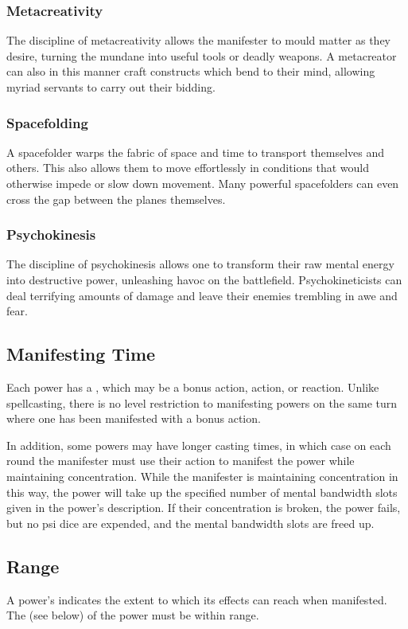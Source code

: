 \subsubsection{Metacreativity}
The discipline of metacreativity allows the manifester to mould
matter as they desire,
turning the mundane into useful tools or deadly weapons.
A metacreator can also in this manner craft constructs
which bend to their mind,
allowing myriad servants to carry out their bidding.

\subsubsection{Spacefolding}
A spacefolder warps the fabric of space and time to
transport themselves and others.
This also allows them to move effortlessly in conditions
that would otherwise impede or slow down movement. 
Many powerful spacefolders can even cross the gap between
the planes themselves.

\subsubsection{Psychokinesis}
The discipline of psychokinesis allows one to transform
their raw mental energy into destructive power,
unleashing havoc on the battlefield.
Psychokineticists can deal terrifying amounts of damage
and leave their enemies trembling in awe and fear.

\subsection{Manifesting Time}
Each power has a ,
which may be a bonus action, action, or reaction.
Unlike spellcasting,
there is no level restriction to manifesting powers
on the same turn where one has been manifested
with a bonus action. 

In addition, some powers may have longer casting times,
in which case on each round the manifester must use their action
to manifest the power while maintaining concentration.
While the manifester is maintaining concentration in this way,
the power will take up the specified number
of mental bandwidth slots given in the power's description.
If their concentration is broken, the power fails,
but no psi dice are expended,
and the mental bandwidth slots are freed up.

\subsection{Range}
A power's  indicates the extent
to which its effects can reach when manifested.
The  (see below) of the power must be within range.

